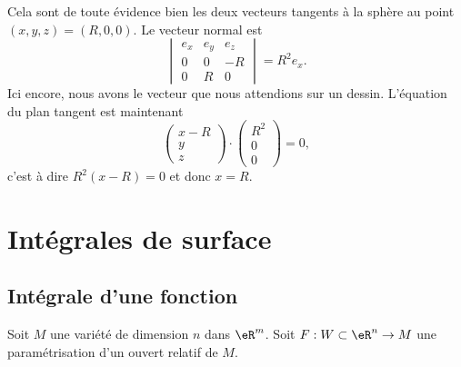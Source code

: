 \begin{example}
    Cela sont de toute évidence bien les deux vecteurs tangents à la sphère au point $(x,y,z)=(R,0,0)$. Le vecteur normal est
    \begin{equation}
        \begin{vmatrix}
            e_x    &   e_y    &   e_z    \\
            0    &   0    &   -R    \\
            0    &   R    &   0
        \end{vmatrix}=R^2e_x.
    \end{equation}
    Ici encore, nous avons le vecteur que nous attendions sur un dessin. L'équation du plan tangent est maintenant
    \begin{equation}
        \begin{pmatrix}
            x-R    \\ 
            y    \\ 
            z    
        \end{pmatrix}\cdot
        \begin{pmatrix}
            R^2    \\ 
            0    \\ 
            0    
        \end{pmatrix}=0,
    \end{equation}
    c'est à dire $R^2(x-R)=0$ et donc $x=R$.
\end{example}

\section{Intégrales de surface}

\subsection{Intégrale d'une fonction}
\label{secintsurfaciques}
Soit $M$ une variété de dimension $n$ dans $\eR^m$. Soit $F : W \subset \eR^n \to M$ une paramétrisation d'un ouvert relatif de $M$.  

